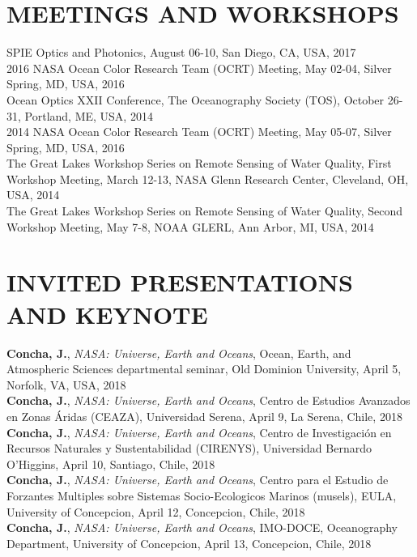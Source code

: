 \documentclass[11pt]{res} %
\begin{document}
\begin{resume}
\section{MEETINGS AND WORKSHOPS}
\vspace{0.1in}
SPIE Optics and Photonics,  August 06-10, San Diego, CA, USA, 2017
\vspace{0.1in}\\
2016 NASA Ocean Color Research Team (OCRT) Meeting,  May 02-04, Silver Spring, MD, USA, 2016
\vspace{0.1in}\\
Ocean Optics XXII Conference, The Oceanography Society (TOS),  October 26-31, Portland, ME, USA, 2014
\vspace{0.1in}\\
2014 NASA Ocean Color Research Team (OCRT) Meeting,  May 05-07, Silver Spring, MD, USA, 2016
\vspace{0.1in}\\
The Great Lakes Workshop Series on Remote Sensing of Water Quality, First Workshop Meeting, March 12-13, NASA Glenn Research Center, Cleveland, OH, USA, 2014
\vspace{0.1in}\\
The Great Lakes Workshop Series on Remote Sensing of Water Quality, Second Workshop Meeting, May 7-8, NOAA GLERL, Ann Arbor, MI, USA, 2014\\

\vspace{-0.1in}
\section{INVITED PRESENTATIONS AND KEYNOTE}
\vspace{0.1in}
{\bf Concha, J.}, {\it NASA: Universe, Earth and Oceans}, Ocean, Earth, and Atmospheric Sciences departmental seminar, Old Dominion University, April 5, Norfolk, VA, USA, 2018
\vspace{0.1in}\\
{\bf Concha, J.}, {\it NASA: Universe, Earth and Oceans}, Centro de Estudios Avanzados en Zonas Áridas (CEAZA), Universidad Serena, April 9, La Serena, Chile, 2018
\vspace{0.1in}\\
{\bf Concha, J.}, {\it NASA: Universe, Earth and Oceans}, Centro de Investigación en Recursos Naturales y Sustentabilidad (CIRENYS), Universidad Bernardo O'Higgins, April 10, Santiago, Chile, 2018
\vspace{0.1in}\\
{\bf Concha, J.}, {\it NASA: Universe, Earth and Oceans}, Centro para el Estudio de Forzantes Multiples sobre Sistemas Socio-Ecologicos Marinos (musels), EULA, University of Concepcion, April 12, Concepcion, Chile, 2018
\vspace{0.1in}\\
{\bf Concha, J.}, {\it NASA: Universe, Earth and Oceans}, IMO-DOCE, Oceanography Department, University of Concepcion, April 13, Concepcion, Chile, 2018
\vspace{0.1in}\\
\vspace{-0.1in}

\end{resume}
\end{document}
